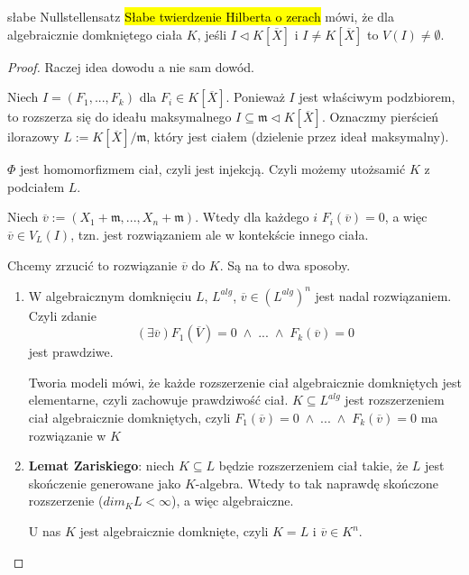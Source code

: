 \begin{theorem}{słabe Nullstellensatz}{}
  \hl{Słabe twierdzenie Hilberta o zerach} mówi, że dla algebraicznie domkniętego ciała $K$, jeśli $I\triangleleft K[\overline{X}]$ i $I\neq K[\overline{X}]$ to $V(I)\neq \emptyset$.
\end{theorem}

\begin{proof}
  Raczej idea dowodu a nie sam dowód.

  Niech $I=(F_1,...,F_k)$ dla $F_i\in K[\overline{X}]$. Ponieważ $I$ jest właściwym podzbiorem, to rozszerza się do ideału maksymalnego $I\subseteq\mathfrak{m}\triangleleft K[\overline{X}]$. Oznaczmy pierścień ilorazowy $L:=K[\overline{X}]/\mathfrak{m}$, który jest ciałem (dzielenie przez ideał maksymalny).

  \begin{center}\end{center}
  $\Phi$ jest homomorfizmem ciał, czyli jest injekcją. Czyli możemy utożsamić $K$ z podciałem $L$.

  Niech $\overline{v}:=(X_1+\mathfrak{m},...,X_n+\mathfrak{m})$. Wtedy dla każdego $i$ $F_i(\overline{v})=0$, a więc $\overline{v}\in V_L(I)$, tzn. jest rozwiązaniem ale w kontekście innego ciała.

  Chcemy zrzucić to rozwiązanie $\overline{v}$ do $K$. Są na to dwa sposoby.
  \begin{enumerate}
    \item W algebraicznym domknięciu $L$, $L^{alg}$, $\overline{v}\in (L^{alg})^n$ jest nadal rozwiązaniem. Czyli zdanie 
      $$(\exists\overline{v})F_1(\overline{V})=0\;\land\;...\;\land\;F_k(\overline{v})=0$$
      jest prawdziwe.

      Tworia modeli mówi, że każde rozszerzenie ciał algebraicznie domkniętych jest elementarne, czyli zachowuje prawdziwość ciał. $K\subseteq L^{alg}$ jest rozszerzeniem ciał algebraicznie domkniętych, czyli $F_1(\overline{v})=0\;\land\;...\;\land\; F_k(\overline{v})=0$ ma rozwiązanie w $K$
    \item \textbf{Lemat Zariskiego}: niech $K\subseteq L$ będzie rozszerzeniem ciał takie, że $L$ jest skończenie generowane jako $K$-algebra. Wtedy to tak naprawdę skończone rozszerzenie ($dim_KL<\infty$), a więc algebraiczne. 

      U nas $K$ jest algebraicznie domknięte, czyli $K=L$ i $\overline{v}\in K^n$. 
  \end{enumerate}
\end{proof}


